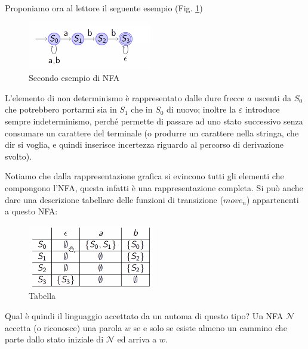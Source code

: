 \documentclass[class=book, crop=false, oneside, 12pt]{standalone}
\begin{document}
Proponiamo ora al lettore il seguente esempio (Fig. \ref{nfa_grafo_2})
\begin{figure}
    \centering
    \includegraphics[width=.5\textwidth,keepaspectratio]{nfa_grafo_2}
    \caption{Secondo esempio di NFA}
    \label{nfa_grafo_2}
\end{figure}
L’elemento di non determinismo è rappresentato dalle dure frecce \(a\) uscenti da \(S_0\) che potrebbero portarmi sia in \(S_1\) che in \(S_0\) di nuovo; inoltre la \(\varepsilon\) introduce sempre indeterminismo, perché permette di passare ad uno stato successivo senza consumare un carattere del terminale (o produrre un carattere nella stringa, che dir si voglia, e quindi inserisce incertezza riguardo al percorso di derivazione svolto).

Notiamo che dalla rappresentazione grafica si evincono tutti gli elementi che compongono l’NFA, questa infatti è una rappresentazione completa.
Si può anche dare una descrizione tabellare delle funzioni di transizione (\(move_n\)) appartenenti a questo NFA:

\begin{figure}
    \centering
    \includegraphics[width=.4\textwidth,keepaspectratio]{tabella}
    \caption{Tabella}
    \label{tabella}
\end{figure}
Qual è quindi il linguaggio accettato da un automa di questo tipo? 
Un NFA \(\mathcal{N}\) accetta (o riconosce) una parola \(w\) se e solo se esiste almeno un cammino che parte dallo stato iniziale di \(\mathcal{N}\) ed arriva a \(w\).
\end{document}
